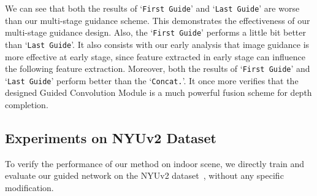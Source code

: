 \documentclass[journal]{IEEEtran}
\begin{document}
We can see that both the results of `\texttt{First Guide}' and `\texttt{Last Guide}' are worse than our multi-stage guidance scheme.
This demonstrates the effectiveness of our multi-stage guidance design.
Also, the `\texttt{First Guide}' performs a little bit better than `\texttt{Last Guide}'.
It also consists with our early analysis that image guidance is more effective at early stage,
since feature extracted in early stage can influence the following feature extraction.
Moreover, both the results of `\texttt{First Guide}' and `\texttt{Last Guide}' perform better than the `\texttt{Concat.}'.
It once more verifies that the designed Guided Convolution Module is a much powerful fusion scheme for depth completion.



\subsection{Experiments on NYUv2 Dataset}
\label{subsec:result_nyu_v2}
To verify the performance of our method on indoor scene, 
we directly train and evaluate our guided network on the NYUv2 dataset~\cite{NYU_V2}, without any specific modification. 
\end{document}
